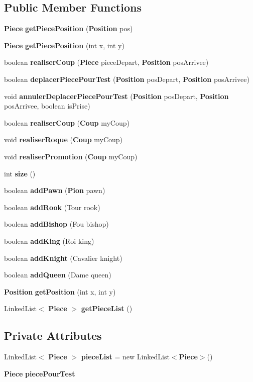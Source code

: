 \subsection*{Public Member Functions}
\begin{DoxyCompactItemize}
\item 
{\bf Piece} {\bf get\-Piece\-Position} ({\bf Position} pos)
\item 
{\bf Piece} {\bf get\-Piece\-Position} (int x, int y)
\item 
boolean {\bf realiser\-Coup} ({\bf Piece} piece\-Depart, {\bf Position} pos\-Arrivee)
\item 
boolean {\bf deplacer\-Piece\-Pour\-Test} ({\bf Position} pos\-Depart, {\bf Position} pos\-Arrivee)
\item 
void {\bf annuler\-Deplacer\-Piece\-Pour\-Test} ({\bf Position} pos\-Depart, {\bf Position} pos\-Arrivee, boolean is\-Prise)
\item 
boolean {\bf realiser\-Coup} ({\bf Coup} my\-Coup)
\item 
void {\bf realiser\-Roque} ({\bf Coup} my\-Coup)
\item 
void {\bf realiser\-Promotion} ({\bf Coup} my\-Coup)
\item 
int {\bf size} ()
\item 
boolean {\bf add\-Pawn} ({\bf Pion} pawn)
\item 
boolean {\bf add\-Rook} (Tour rook)
\item 
boolean {\bf add\-Bishop} (Fou bishop)
\item 
boolean {\bf add\-King} (Roi king)
\item 
boolean {\bf add\-Knight} (Cavalier knight)
\item 
boolean {\bf add\-Queen} (Dame queen)
\item 
{\bf Position} {\bf get\-Position} (int x, int y)
\item 
Linked\-List$<$ {\bf Piece} $>$ {\bf get\-Piece\-List} ()
\end{DoxyCompactItemize}
\subsection*{Private Attributes}
\begin{DoxyCompactItemize}
\item 
Linked\-List$<$ {\bf Piece} $>$ {\bf piece\-List} = new Linked\-List$<${\bf Piece}$>$()
\item 
{\bf Piece} {\bf piece\-Pour\-Test}
\end{DoxyCompactItemize}


